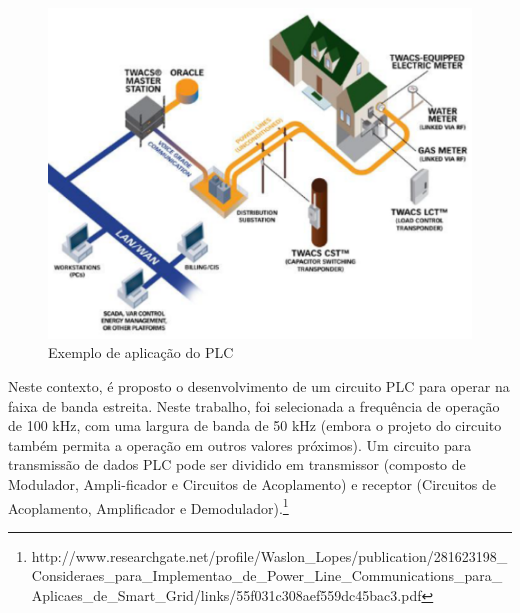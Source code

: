 \begin{figure}[H]
  \begin{center}
	\includegraphics[keepaspectratio]{figuras/exemplo_plc.eps}
	\caption{Exemplo de aplicação do PLC}
  \end{center}
\end{figure}

	Neste contexto, é proposto o desenvolvimento de um circuito PLC para operar na faixa de banda estreita. Neste trabalho, foi selecionada a frequência de operação de 100 kHz, com uma largura de banda de 50 kHz (embora o projeto do circuito também permita a operação em outros valores próximos). Um circuito para transmissão de dados PLC pode ser dividido em transmissor (composto de Modulador, Ampli-ficador e Circuitos de Acoplamento) e receptor (Circuitos de Acoplamento, Amplificador e Demodulador).\footnote{http://www.researchgate.net/profile/Waslon\_Lopes/publication/281623198\_Consideraes\_para\_Implementao\_de\_Power\_Line\_Communications\_para\_Aplicaes\_de\_Smart\_Grid/links/55f031c308aef559dc45bac3.pdf}

